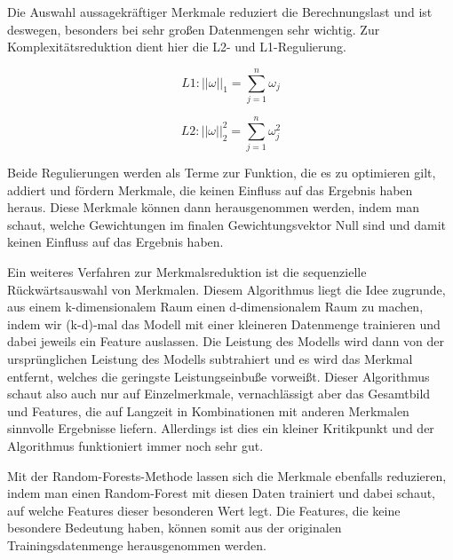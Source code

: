 \documentclass[11pt]{article} %
\begin{document}
Die Auswahl aussagekräftiger Merkmale reduziert die Berechnungslast und ist deswegen, besonders bei sehr großen Datenmengen
sehr wichtig. Zur Komplexitätsreduktion dient hier die L2- und L1-Regulierung. 

\begin{equation}
L1 : ||\omega||_1 = \sum_{j=1}^n \omega_j
\end{equation}

\begin{equation}
L2 : ||\omega||^2_2 = \sum_{j=1}^n \omega_j^2
\end{equation}


Beide Regulierungen werden als Terme zur Funktion, die es zu optimieren gilt, addiert und fördern Merkmale, die keinen Einfluss auf das Ergebnis 
haben heraus. Diese Merkmale können dann herausgenommen werden, indem man schaut, welche Gewichtungen im finalen
Gewichtungsvektor Null sind und damit keinen Einfluss auf das Ergebnis haben.

Ein weiteres Verfahren zur Merkmalsreduktion ist die sequenzielle Rückwärtsauswahl von Merkmalen. 
Diesem Algorithmus liegt die Idee zugrunde, aus einem k-dimensionalem Raum einen d-dimensionalem Raum
zu machen, indem wir (k-d)-mal das Modell mit einer kleineren Datenmenge trainieren und dabei jeweils ein Feature
auslassen. Die Leistung des Modells wird dann von der ursprünglichen Leistung des Modells subtrahiert und 
es wird das Merkmal entfernt, welches die geringste Leistungseinbuße vorweißt. Dieser Algorithmus 
schaut also auch nur auf Einzelmerkmale, vernachlässigt aber das Gesamtbild und Features, die auf Langzeit in
Kombinationen mit anderen Merkmalen sinnvolle Ergebnisse liefern. Allerdings ist dies ein kleiner Kritikpunkt
und der Algorithmus funktioniert immer noch sehr gut.

Mit der Random-Forests-Methode lassen sich die Merkmale ebenfalls reduzieren, indem man einen Random-Forest mit 
diesen Daten trainiert und dabei schaut, auf welche Features dieser besonderen Wert legt. Die Features, die
keine besondere Bedeutung haben, können somit aus der originalen Trainingsdatenmenge herausgenommen werden.
\end{document}
